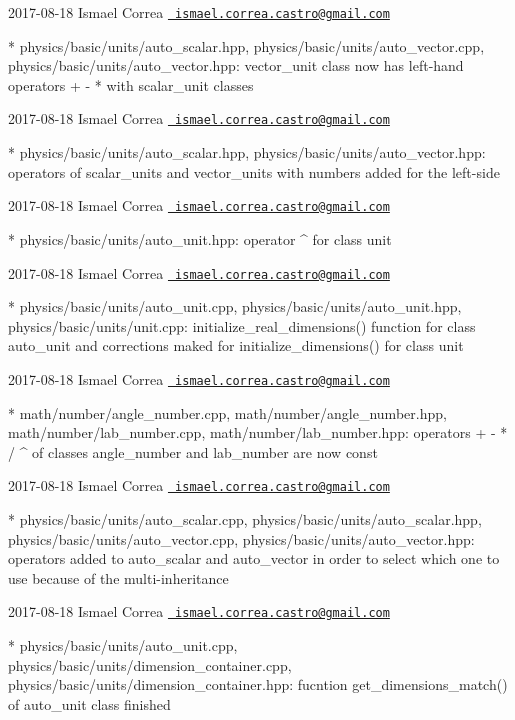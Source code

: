  2017-\/08-\/18 Ismael Correa \href{mailto:ismael.correa.castro@gmail.com}{\texttt{ ismael.\+correa.\+castro@gmail.\+com}} \begin{DoxyVerb}* physics/basic/units/auto_scalar.hpp,
physics/basic/units/auto_vector.cpp,
physics/basic/units/auto_vector.hpp: vector_unit class now has
left-hand operators + - * with scalar_unit classes
\end{DoxyVerb}
 2017-\/08-\/18 Ismael Correa \href{mailto:ismael.correa.castro@gmail.com}{\texttt{ ismael.\+correa.\+castro@gmail.\+com}} \begin{DoxyVerb}* physics/basic/units/auto_scalar.hpp,
physics/basic/units/auto_vector.hpp: operators of scalar_units and
vector_units with numbers added for the left-side
\end{DoxyVerb}
 2017-\/08-\/18 Ismael Correa \href{mailto:ismael.correa.castro@gmail.com}{\texttt{ ismael.\+correa.\+castro@gmail.\+com}} \begin{DoxyVerb}* physics/basic/units/auto_unit.hpp: operator ^ for class unit
\end{DoxyVerb}
 2017-\/08-\/18 Ismael Correa \href{mailto:ismael.correa.castro@gmail.com}{\texttt{ ismael.\+correa.\+castro@gmail.\+com}} \begin{DoxyVerb}* physics/basic/units/auto_unit.cpp,
physics/basic/units/auto_unit.hpp, physics/basic/units/unit.cpp: 
initialize_real_dimensions() function for class auto_unit and
corrections maked for initialize_dimensions() for class unit
\end{DoxyVerb}
 2017-\/08-\/18 Ismael Correa \href{mailto:ismael.correa.castro@gmail.com}{\texttt{ ismael.\+correa.\+castro@gmail.\+com}} \begin{DoxyVerb}* math/number/angle_number.cpp, math/number/angle_number.hpp,
math/number/lab_number.cpp, math/number/lab_number.hpp: operators +
- * / ^ of classes angle_number and lab_number are now const
\end{DoxyVerb}
 2017-\/08-\/18 Ismael Correa \href{mailto:ismael.correa.castro@gmail.com}{\texttt{ ismael.\+correa.\+castro@gmail.\+com}} \begin{DoxyVerb}* physics/basic/units/auto_scalar.cpp,
physics/basic/units/auto_scalar.hpp,
physics/basic/units/auto_vector.cpp,
physics/basic/units/auto_vector.hpp: operators added to auto_scalar
and auto_vector in order to select which one to use because of the
multi-inheritance
\end{DoxyVerb}
 2017-\/08-\/18 Ismael Correa \href{mailto:ismael.correa.castro@gmail.com}{\texttt{ ismael.\+correa.\+castro@gmail.\+com}} \begin{DoxyVerb}* physics/basic/units/auto_unit.cpp,
physics/basic/units/dimension_container.cpp,
physics/basic/units/dimension_container.hpp: fucntion
get_dimensions_match() of auto_unit class finished
\end{DoxyVerb}
